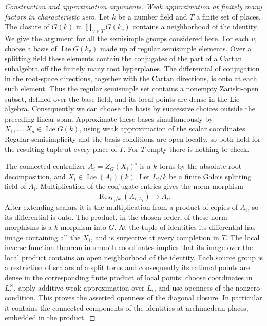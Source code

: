 \documentclass[11pt,a4paper,openany,oneside]{book}
\theoremstyle{resultstyle}
\theoremstyle{definition}
\numberwithin{equation}{chapter}
\begin{document}
\begin{proof}[Construction and approximation arguments]
\medskip\noindent
\textit{Weak approximation at finitely many factors in characteristic zero.}
Let \(k\) be a number field and \(T\) a finite set of places.
The closure of \(G(k)\) in \(\prod_{v\in T}G(k_v)\) contains
a neighborhood of the identity. We give the argument for all
the semisimple groups considered here. For each \(v\), choose
a basis of \(\operatorname{Lie}G(k_v)\) made up of regular
semisimple elements. Over a splitting field these elements
contain the conjugates of the part of a Cartan subalgebra
off the finitely many root hyperplanes. The differential of
conjugation in the root-space directions, together with the
Cartan directions, is onto at each such element. Thus the
regular semisimple set contains a nonempty Zariski-open
subset, defined over the base field, and its local points
are dense in the Lie algebra. Consequently we can choose
the basis by successive choices outside the preceding linear
span. Approximate these bases simultaneously by
\(X_1,\ldots,X_d\in\operatorname{Lie}G(k)\), using weak
approximation of the scalar coordinates. Regular
semisimplicity and the basis conditions are open locally,
so both hold for the resulting tuple at every place of \(T\).
For \(T\) empty there is nothing to check.

The connected centralizer \(A_i=Z_G(X_i)^\circ\) is a
\(k\)-torus by the absolute root decomposition, and
\(X_i\in\operatorname{Lie}(A_i)(k)\). Let \(L_i/k\) be a finite
Galois splitting field of \(A_i\). Multiplication of the
conjugate entries gives the norm morphism
\[
 \operatorname{Res}_{L_i/k}(A_{i,L_i})\longrightarrow A_i .
\]
After extending scalars it is the multiplication from a
product of copies of \(A_i\), so its differential is onto.
The product, in the chosen order, of these norm morphisms
is a \(k\)-morphism into \(G\). At the tuple of identities its
differential has image containing all the \(X_i\), and is
surjective at every completion in \(T\). The local inverse
function theorem in smooth coordinates implies that its
image over the local product contains an open neighborhood
of the identity. Each source group is a restriction of
scalars of a split torus and consequently its rational
points are dense in the corresponding finite product of
local points: choose coordinates in \(L_i^\times\), apply
additive weak approximation over \(L_i\), and use openness
of the nonzero condition. This proves the asserted openness of
the diagonal closure. In particular it contains the connected
components of the identities at archimedean places, embedded
in the product.


\end{proof}
\end{document}
